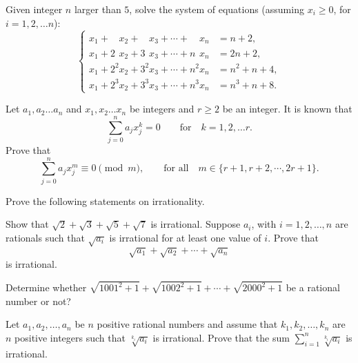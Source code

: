 \documentclass[12pt,a4paper]{memoir}
\theoremstyle{definition}
\begin{document}
\begin{question}[name={2004 China TST}]
	Given integer $ n$ larger than $ 5$, solve the system of equations (assuming $x_i \geq 0$, for $ i=1,2, \dots n$):
	\[ \begin{cases} \displaystyle x_1+ \phantom{2^2} x_2+ \phantom{3^2} x_3 + \cdots + \phantom{n^2} x_n &= n+2, \\ x_1 + 2\phantom{^2}x_2 + 3\phantom{^2}x_3 + \cdots + n\phantom{^2}x_n &= 2n+2, \\ x_1 + 2^2x_2 + 3^2 x_3 + \cdots + n^2x_n &= n^2 + n +4, \\ x_1+ 2^3x_2 + 3^3x_3+ \cdots + n^3x_n &= n^3 + n + 8. \end{cases} \]
\end{question}




\begin{question}[name={2005 China TST}]
	Let $a_1,a_2 \dots a_n$ and $x_1, x_2 \dots x_n$ be integers and $r\geq 2$ be an integer. It is known that \[\sum_{j=0}^{n} a_j x_j^k =0 \qquad \text{for} \quad k=1,2, \dots r.\]
	Prove that
	\[\sum_{j=0}^{n} a_j x_j^m \equiv 0 \pmod m, \qquad \text{for all}\quad  m \in \{ r+1, r+2, \cdots, 2r+1 \}.\]
\end{question}


\begin{question}
	Prove the following statements on irrationality.
	\begin{tasks}
		\task Show that $\sqrt{2} + \sqrt{3} + \sqrt{5} + \sqrt{7}$ is irrational.
		\task Suppose $a_i$, with $i=1,2, \dots ,n$ are rationals such that $\sqrt{a_i}$ is irrational for at least one value of $i$. Prove that \[\sqrt{a_1} + \sqrt{a_2} + \cdots + \sqrt{a_n}\] is irrational.
	\end{tasks}
\end{question}


\begin{question}[name={2005 China TST}]
	Determine whether $\sqrt{1001^2+1}+\sqrt{1002^2+1}+ \cdots + \sqrt{2000^2+1}$ be a rational number or not?
\end{question}


\begin{question}[name={Zhaobin vs Vess}]
	Let $a_1,a_2,\dots,a_n$ be $n$ positive rational numbers and assume that $k_1,k_2,\dots,k_n$ are $n$ positive integers such that $\sqrt[{k_i}]{a_i}$ is irrational. Prove that the sum $\sum_{i=1}^{n} \sqrt[{k_i}]{a_i}$ is irrational.
\end{question}
\end{document}
